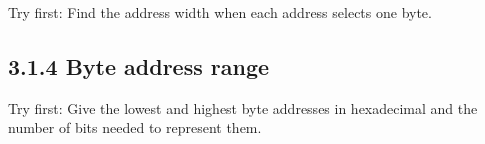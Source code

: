 \documentclass[11pt]{article}
\begin{document}
\begin{keepsection}
\begin{keepsection}
Try first: Find the address width when each address selects one byte.

\end{keepsection}

\begin{keepsection}
\subsection{3.1.4 Byte address range}

Try first: Give the lowest and highest byte addresses in hexadecimal and the number of bits needed to represent them.

\end{keepsection}
\end{keepsection}
\end{document}
